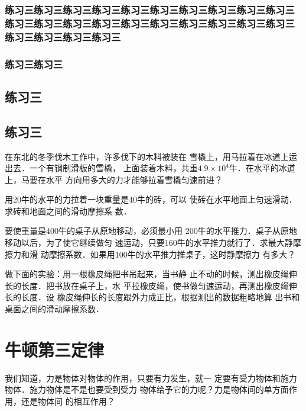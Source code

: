 \subsubsection{练习三练习三练习三练习三练习三练习三练习三练习三练习三练习三练习三练习三练习三练习三练习三练习三练习三练习三练习三练习三练习三练习三练习三练习三}


\subsubsection{练习三练习三}


\subsection{练习三}
\subsection*{练习三}
\Example{\zhlipsum[1]}

\makeatletter

\makeatother



\Answer{\zhlipsum[1]}
\Answer*{\zhlipsum[1]}





\begin{QsNum}
\item  在东北的冬季伐木工作中，许多伐下的木料被装在
雪橇上，用马拉着在冰道上运出去．一个有钢制滑板的雪橇，
上面装着木料，共重$4.9\times 10^4$牛．在水平的冰道上，马要在水平
方向用多大的力才能够拉着雪橇匀速前进？

\item  用20牛的水平的力拉着一块重量是40牛的砖，可以
使砖在水平地面上匀速滑动．求砖和地面之间的滑动摩擦系
数．
\item  要使重量是400牛的桌子从原地移动，必须最小用
200牛的水平推力．桌子从原地移动以后，为了使它继续做匀
速运动，只要160牛的水平推力就行了．求最大静摩擦力和滑
动摩擦系数．如果用100牛的水平推力推桌子，这时静摩擦力
有多大？

\item  做下面的实验：用一根橡皮绳把书吊起来，当书静
止不动的时候，测出橡皮绳伸长的长度．把书放在桌子上，水
平拉橡皮绳，使书做匀速运动，再测出橡皮绳伸长的长度．设
橡皮绳伸长的长度跟外力成正比，根据测出的数据粗略地算
出书和桌面之间的滑动摩擦系数．
\end{QsNum}


\section{牛顿第三定律}
我们知道，力是物体对物体的作用，只要有力发生，就一
定要有受力物体和施力物体．施力物体是不是也要受到受力
物体给予它的力呢？力是物体间的单方面作用，还是物体间
的相互作用？

